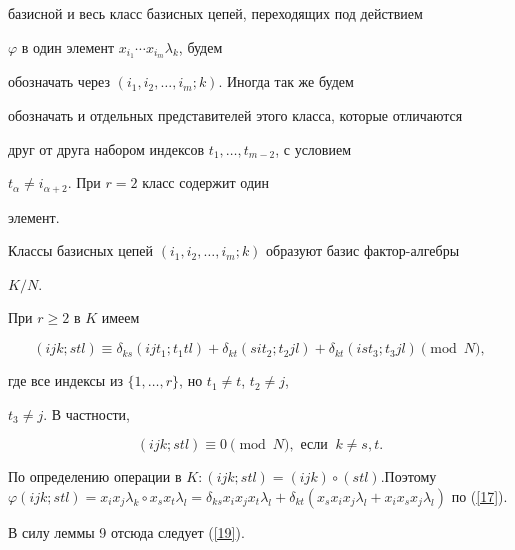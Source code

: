 базисной и весь класс базисных цепей, переходящих под действием


$\varphi $ в один элемент $x_{i_1}\dotsb x_{i_m}\lambda _k$, будем


обозначать через $(i_1,i_2,\dotsc ,i_m;k)$. Иногда так же будем


обозначать и отдельных представителей этого класса, которые отличаются


друг от друга набором индексов $t_1,\dotsc ,t_{m-2}$, с условием


$t_{\alpha }\ne i_{\alpha +2}$. При $r=2$ класс содержит один


элемент.





\begin{cor} Классы базисных цепей $(i_1,i_2,\dotsc ,


i_m;k)$ образуют базис фактор-алгебры \linebreak


$K/N$.


\end{cor}





\begin{lem} При $r\ge 2$ в $K$ имеем


\begin{equation}\label{19}


(ijk;stl)\equiv \delta _{ks}(ijt_1;t_1tl)+


\delta _{kt}(sit_2;t_2jl)+


\delta _{kt}(ist_3;t_3jl)  \pmod{N},


\end{equation}


где все индексы из $\{1,\dotsc ,r\}$, но $t_1\ne t$, $t_2\ne j$,


$t_3\ne j$. В частности,


$$


(ijk;stl)\equiv 0 \pmod{N}, \text{ если }\ k\ne s, t.


$$


\end{lem}





\begin{pf} По определению операции в $K: (ijk;stl)=


(ijk)\circ (stl)$.Поэтому $\varphi (ijk;stl)=x_ix_j\lambda _k\circ


x_sx_t\lambda _l=\delta _{ks}x_ix_jx_t\lambda _l+


\delta _{kt}(x_sx_ix_j\lambda _l+x_ix_sx_j\lambda _l)$ по (\ref{17}).


В силу леммы 9 отсюда следует (\ref{19}).


\end{pf}





